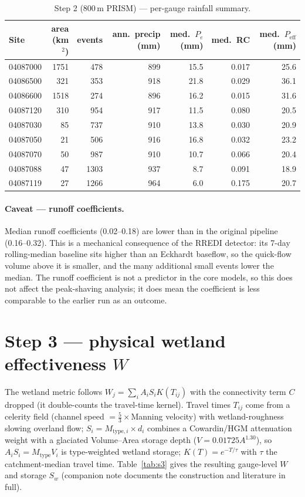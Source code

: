 \documentclass[11pt]{article}
\begin{document}
\begin{table}[htbp]\centering
\caption{Step 2 (800\,m PRISM) --- per-gauge rainfall summary.}
\label{tab:s2}\small
\begin{tabular}{lrrrrrr}
\toprule
Site & area (km$^2$) & events & ann.\ precip (mm) & med.\ $P_e$ (mm) & med.\ RC & med.\ $P_{\text{eff}}$ (mm) \\
\midrule
04087000 & 1751 & 478  & 899 & 15.5 & 0.017 & 25.6 \\
04086500 & 321  & 353  & 918 & 21.8 & 0.029 & 36.1 \\
04086600 & 1518 & 274  & 896 & 16.2 & 0.015 & 31.6 \\
04087120 & 310  & 954  & 917 & 11.5 & 0.080 & 20.5 \\
04087030 & 85   & 737  & 910 & 13.8 & 0.030 & 20.9 \\
04087050 & 21   & 506  & 916 & 16.8 & 0.032 & 23.2 \\
04087070 & 50   & 987  & 910 & 10.7 & 0.066 & 20.4 \\
04087088 & 47   & 1303 & 937 & 8.7  & 0.091 & 18.9 \\
04087119 & 27   & 1266 & 964 & 6.0  & 0.175 & 20.7 \\
\bottomrule
\end{tabular}
\end{table}

\paragraph{Caveat --- runoff coefficients.} Median runoff coefficients (0.02--0.18) are lower than
in the original pipeline (0.16--0.32). This is a mechanical consequence of the RREDI detector: its
7-day rolling-median baseline sits higher than an Eckhardt baseflow, so the quick-flow volume above
it is smaller, and the many additional small events lower the median. The runoff coefficient is not
a predictor in the core models, so this does not affect the peak-shaving analysis; it does mean the
coefficient is less comparable to the earlier run as an outcome.

\section{Step 3 --- physical wetland effectiveness $W$}
The wetland metric follows $W_j=\sum_i A_i S_i K(T_{ij})$ with the connectivity term $C$ dropped
(it double-counts the travel-time kernel). Travel times $T_{ij}$ come from a celerity field
(channel speed $=\tfrac{5}{3}\times$Manning velocity) with wetland-roughness slowing overland
flow; $S_i=M_{\text{type},i}\times d_i$ combines a Cowardin/HGM attenuation weight with a glaciated
Volume--Area storage depth ($V=0.01725A^{1.30}$), so $A_iS_i=M_{\text{type}}V_i$ is type-weighted
wetland storage; $K(T)=e^{-T/\tau}$ with $\tau$ the catchment-median travel time. Table~\ref{tab:s3}
gives the resulting gauge-level $W$ and storage $S_w$ (companion note documents the construction and
literature in full).
\end{document}
